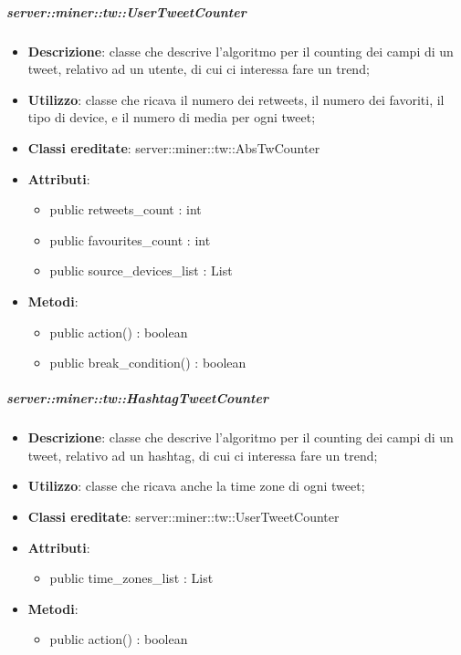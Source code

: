 	\subparagraph{server::miner::tw::UserTweetCounter} %
		\label{subp:server_miner_tw_UserTweetCounter}
			\begin{itemize}
				\item \textbf{Descrizione}: classe che descrive l'algoritmo per il counting dei campi di un tweet, relativo ad un utente, di cui ci interessa fare un trend;
				\item \textbf{Utilizzo}: classe che ricava il numero dei retweets, il numero dei favoriti, il tipo di device, e il numero di media per ogni tweet;
				\item \textbf{Classi ereditate}: server::miner::tw::AbsTwCounter
				\item \textbf{Attributi}:    
					\begin{itemize}
						\item public retweets\_count : int
						\item public favourites\_count : int
						\item public source\_devices\_list : List
					\end{itemize}
				\item \textbf{Metodi}:  
					\begin{itemize}
						\item public action() : boolean
						\item public break\_condition() : boolean
					\end{itemize}
			\end{itemize}


	\subparagraph{server::miner::tw::HashtagTweetCounter} %
		\label{subp:server_miner_tw_HashtagTweetCounter}
			\begin{itemize}
				\item \textbf{Descrizione}: classe che descrive l'algoritmo per il counting dei campi di un tweet, relativo ad un hashtag, di cui ci interessa fare un trend;
				\item \textbf{Utilizzo}: classe che ricava anche la time zone di ogni tweet;
				\item \textbf{Classi ereditate}: server::miner::tw::UserTweetCounter
				\item \textbf{Attributi}:    
					\begin{itemize}
						\item public time\_zones\_list : List
					\end{itemize}
				\item \textbf{Metodi}:  
					\begin{itemize}
						\item public action() : boolean
					\end{itemize}
			\end{itemize}

